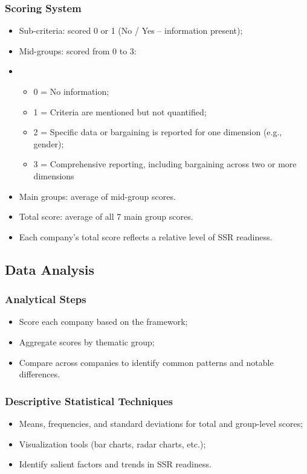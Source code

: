 \subsubsection{Scoring System}
\begin{itemize}
    \item Sub-criteria: scored 0 or 1 (No / Yes -- information present);
    \item Mid-groups: scored from 0 to 3:
    \item \begin{itemize}
        \item 0 = No information;
        \item 1 = Criteria are mentioned but not quantified;
        \item 2 = Specific data or bargaining is reported for one dimension (e.g., gender);
        \item 3 = Comprehensive reporting, including bargaining across two or more dimensions
    \end{itemize}
    \item Main groups: average of mid-group scores.
    \item Total score: average of all 7 main group scores.
    \item Each company's total score reflects a relative level of SSR readiness.
\end{itemize}

\subsection{Data Analysis}
\subsubsection{Analytical Steps}
\begin{itemize}
    \item Score each company based on the framework;
    \item Aggregate scores by thematic group;
    \item Compare across companies to identify common patterns and notable differences.
\end{itemize}

\subsubsection{Descriptive Statistical Techniques}
\begin{itemize}
    \item Means, frequencies, and standard deviations for total and group-level scores;
    \item Visualization tools (bar charts, radar charts, etc.);
    \item Identify salient factors and trends in SSR readiness.
\end{itemize}

